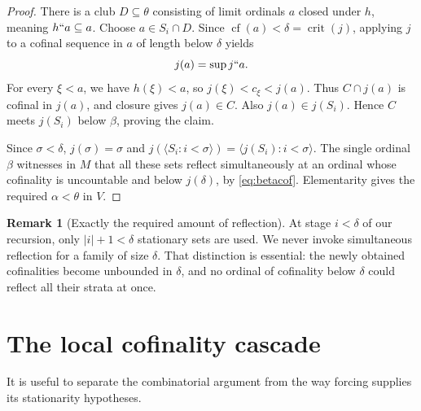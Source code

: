 \documentclass[11pt,letterpaper]{article}
\theoremstyle{definition}
\newtheorem{remark}[definition]{Remark}
\numberwithin{equation}{section}
\newcommand{\cf}{\operatorname{cf}}
\newcommand{\crit}{\operatorname{crit}}
\begin{document}
\begin{proof}
There is a club $D\subseteq\theta$ consisting of limit ordinals $a$ closed under $h$, meaning $h``a\subseteq a$. Choose $a\in S_i\cap D$. Since $\cf(a)<\delta=\crit(j)$, applying $j$ to a cofinal sequence in $a$ of length below $\delta$ yields
\[
j(a)=\sup j``a.
\]
For every $\xi<a$, we have $h(\xi)<a$, so
$j(\xi)<c_\xi<j(a)$. Thus $C\cap j(a)$ is cofinal in $j(a)$, and closure gives $j(a)\in C$. Also $j(a)\in j(S_i)$. Hence $C$ meets $j(S_i)$ below $\beta$, proving the claim.

Since $\sigma<\delta$, $j(\sigma)=\sigma$ and
$j(\langle S_i:i<\sigma\rangle)=\langle j(S_i):i<\sigma\rangle$.
The single ordinal $\beta$ witnesses in $M$ that all these sets reflect simultaneously at an ordinal whose cofinality is uncountable and below $j(\delta)$, by \eqref{eq:betacof}. Elementarity gives the required $\alpha<\theta$ in $V$.
\end{proof}

\begin{remark}[Exactly the required amount of reflection]
At stage $i<\delta$ of our recursion, only $|i|+1<\delta$ stationary sets are used. We never invoke simultaneous reflection for a family of size $\delta$. That distinction is essential: the newly obtained cofinalities become unbounded in $\delta$, and no ordinal of cofinality below $\delta$ could reflect all their strata at once.
\end{remark}

\section{The local cofinality cascade}\label{sec:cascade}

It is useful to separate the combinatorial argument from the way forcing supplies its stationarity hypotheses.
\end{document}
